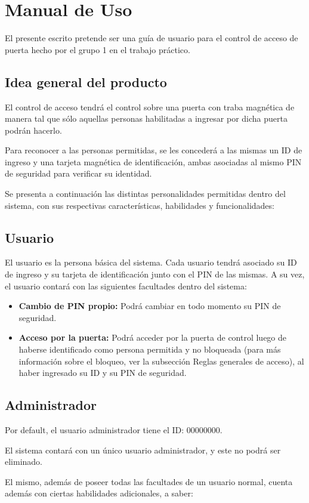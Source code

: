\documentclass[10pt,a4paper]{article}
\author{Tomás González Orlando}
\begin{document}
\section{Manual de Uso}

El presente escrito pretende ser una guía de usuario para el control de acceso de puerta hecho por el grupo 1 en el trabajo práctico.
\subsection{Idea general del producto}
El control de acceso tendrá el control sobre una puerta con traba magnética de manera tal que sólo aquellas personas habilitadas a ingresar por dicha puerta podrán hacerlo. \par
Para reconocer a las personas permitidas, se les concederá a las mismas un ID de ingreso y una tarjeta magnética de identificación, ambas asociadas al mismo PIN de seguridad para verificar su identidad. \par
Se presenta a continuación las distintas personalidades permitidas dentro del sistema, con sus respectivas características, habilidades y funcionalidades:\par

\subsection{Usuario}
El usuario es la persona básica del sistema. Cada usuario tendrá asociado su ID de ingreso y su tarjeta de identificación junto con el PIN de las mismas. A su vez, el usuario contará con las siguientes facultades dentro del sistema:
\begin{itemize}
\item \textbf{Cambio de PIN propio: } Podrá cambiar en todo momento su PIN de seguridad.
\item \textbf{Acceso por la puerta: } Podrá acceder por la puerta de control luego de haberse identificado como persona permitida y no bloqueada (para más información sobre el bloqueo, ver la subsección Reglas generales de acceso), al haber ingresado su ID y su PIN de seguridad.
\end{itemize}


\subsection{Administrador}
Por default, el usuario administrador tiene el ID: 00000000. \par
El sistema contará con un único usuario administrador, y este no podrá ser eliminado.\par
El mismo, además de poseer todas las facultades de un usuario normal, cuenta además con ciertas habilidades adicionales, a saber:
\end{document}
